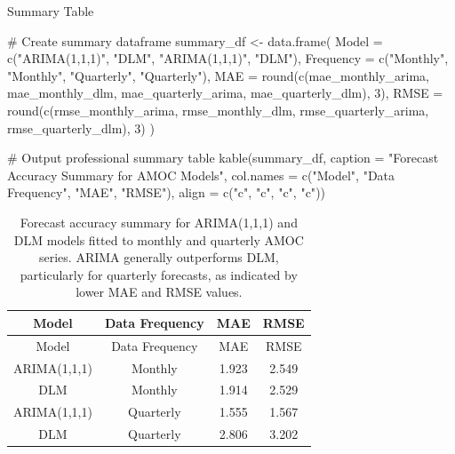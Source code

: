 \documentclass[
  11pt,
]{article}
\newenvironment{Shaded}{\begin{snugshade}}{\end{snugshade}}
\newcommand{\AttributeTok}[1]{\textcolor[rgb]{0.40,0.45,0.13}{#1}}
\newcommand{\CommentTok}[1]{\textcolor[rgb]{0.37,0.37,0.37}{#1}}
\newcommand{\DecValTok}[1]{\textcolor[rgb]{0.68,0.00,0.00}{#1}}
\newcommand{\FunctionTok}[1]{\textcolor[rgb]{0.28,0.35,0.67}{#1}}
\newcommand{\NormalTok}[1]{\textcolor[rgb]{0.00,0.23,0.31}{#1}}
\newcommand{\OtherTok}[1]{\textcolor[rgb]{0.00,0.23,0.31}{#1}}
\newcommand{\StringTok}[1]{\textcolor[rgb]{0.13,0.47,0.30}{#1}}
\begin{document}
Summary Table

\begin{Shaded}
\begin{Highlighting}[]
\CommentTok{\# Create summary dataframe}
\NormalTok{summary\_df }\OtherTok{\textless{}{-}} \FunctionTok{data.frame}\NormalTok{(}
  \AttributeTok{Model =} \FunctionTok{c}\NormalTok{(}\StringTok{"ARIMA(1,1,1)"}\NormalTok{, }\StringTok{"DLM"}\NormalTok{, }\StringTok{"ARIMA(1,1,1)"}\NormalTok{, }\StringTok{"DLM"}\NormalTok{),}
  \AttributeTok{Frequency =} \FunctionTok{c}\NormalTok{(}\StringTok{"Monthly"}\NormalTok{, }\StringTok{"Monthly"}\NormalTok{, }\StringTok{"Quarterly"}\NormalTok{, }\StringTok{"Quarterly"}\NormalTok{),}
  \AttributeTok{MAE =} \FunctionTok{round}\NormalTok{(}\FunctionTok{c}\NormalTok{(mae\_monthly\_arima, mae\_monthly\_dlm, mae\_quarterly\_arima, mae\_quarterly\_dlm), }\DecValTok{3}\NormalTok{),}
  \AttributeTok{RMSE =} \FunctionTok{round}\NormalTok{(}\FunctionTok{c}\NormalTok{(rmse\_monthly\_arima, rmse\_monthly\_dlm, rmse\_quarterly\_arima, rmse\_quarterly\_dlm), }\DecValTok{3}\NormalTok{)}
\NormalTok{)}

\CommentTok{\# Output professional summary table}
\FunctionTok{kable}\NormalTok{(summary\_df, }\AttributeTok{caption =} \StringTok{"Forecast Accuracy Summary for AMOC Models"}\NormalTok{,}
      \AttributeTok{col.names =} \FunctionTok{c}\NormalTok{(}\StringTok{"Model"}\NormalTok{, }\StringTok{"Data Frequency"}\NormalTok{, }\StringTok{"MAE"}\NormalTok{, }\StringTok{"RMSE"}\NormalTok{),}
      \AttributeTok{align =} \FunctionTok{c}\NormalTok{(}\StringTok{"c"}\NormalTok{, }\StringTok{"c"}\NormalTok{, }\StringTok{"c"}\NormalTok{, }\StringTok{"c"}\NormalTok{))}
\end{Highlighting}
\end{Shaded}

\begin{longtable}[]{@{}cccc@{}}
\caption{Forecast accuracy summary for ARIMA(1,1,1) and DLM models
fitted to monthly and quarterly AMOC series. ARIMA generally outperforms
DLM, particularly for quarterly forecasts, as indicated by lower MAE and
RMSE values.}\tabularnewline
\toprule\noalign{}
Model & Data Frequency & MAE & RMSE \\
\midrule\noalign{}
\endfirsthead
\toprule\noalign{}
Model & Data Frequency & MAE & RMSE \\
\midrule\noalign{}
\endhead
\bottomrule\noalign{}
\endlastfoot
ARIMA(1,1,1) & Monthly & 1.923 & 2.549 \\
DLM & Monthly & 1.914 & 2.529 \\
ARIMA(1,1,1) & Quarterly & 1.555 & 1.567 \\
DLM & Quarterly & 2.806 & 3.202 \\
\end{longtable}
\end{document}
